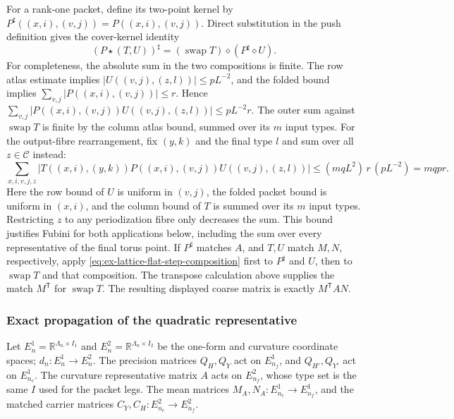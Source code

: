For a rank-one packet, define its two-point kernel by
$P^{\sharp}((x,i),(v,j))=P((x,i),(v,j))$. Direct substitution in the push
definition gives the cover-kernel identity
\begin{equation}
 (P\star(T,U))^{\sharp}
 =(\operatorname{swap}T)\diamond(P^{\sharp}\diamond U).
 \label{eq:ex-lattice-flat-step-second-composition}
\end{equation}
For completeness, the absolute sum in the two compositions is finite. The
row atlas estimate implies $|U((v,j),(z,l))|\leq pL^{-2}$, and the folded
bound implies $\sum_{v,j}|P((x,i),(v,j))|\leq r$. Hence
$\sum_{v,j}|P((x,i),(v,j))U((v,j),(z,l))|\leq pL^{-2}r$.
The outer sum against $\operatorname{swap}T$ is finite by the column atlas
bound, summed over its $m$ input types. For the output-fibre rearrangement,
fix $(y,k)$ and the final type $l$ and sum over all $z\in\mathcal C$ instead:
\[
 \sum_{x,i,v,j,z}|T((x,i),(y,k))P((x,i),(v,j))U((v,j),(z,l))|
 \leq (m qL^2)\,r\,(pL^{-2})=m qpr.
\]
Here the row bound of $U$ is uniform in $(v,j)$, the folded packet bound
is uniform in $(x,i)$, and the column bound of $T$ is summed over its $m$
input types. Restricting $z$ to any periodization fibre only decreases the
sum. This bound justifies Fubini for both applications below, including the
sum over every representative of the final torus point.
If $P^{\sharp}$ matches $A$, and $T,U$ match $M,N$, respectively, apply
\eqref{eq:ex-lattice-flat-step-composition} first to $P^{\sharp}$ and $U$,
then to $\operatorname{swap}T$ and that composition. The transpose calculation
above supplies the match $M^{\mathsf T}$ for $\operatorname{swap}T$.
The resulting displayed coarse matrix is exactly $M^{\mathsf T}AN$.

\subsubsection{Exact propagation of the quadratic representative}

Let $E_n^1=\mathbb R^{\Lambda_n\times I_1}$ and
$E_n^2=\mathbb R^{\Lambda_n\times I_2}$ be the one-form and curvature
coordinate spaces; $d_n:E_n^1\to E_n^2$. The precision matrices
$Q_H,Q_Y$ act on $E_{n_f}^1$, and $Q_{H'},Q_{Y'}$ act on $E_{n_c}^1$.
The curvature representative matrix $A$ acts on $E_{n_f}^2$, whose type set is the same $I$ used for the packet legs. The mean matrices
$M_A,N_A:E_{n_c}^1\to E_{n_f}^1$, and the matched carrier matrices
$C_Y,C_H:E_{n_c}^2\to E_{n_f}^2$.

